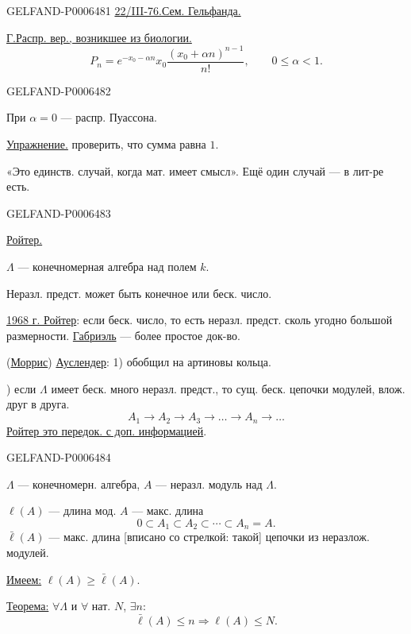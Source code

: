 \begin{GelfandAdjacentEvidence}{GELFAND-P000648}{1}
\underline{22/III-76.}\quad\underline{Сем. Гельфанда.}

\underline{Г.}\quad\underline{Распр. вер., возникшее из биологии.}
\[
P_n=e^{-x_0-\alpha n}x_0\frac{(x_0+\alpha n)^{n-1}}{n!},
\qquad 0\leqslant\alpha<1.
\]
\end{GelfandAdjacentEvidence}
\begin{GelfandAdjacentEvidence}{GELFAND-P000648}{2}


При \(\alpha=0\) --- распр. Пуассона.

\underline{Упражнение.} проверить, что сумма равна \(1\).

«Это единств. случай, когда мат. имеет смысл». Ещё один случай --- в лит-ре есть.
\end{GelfandAdjacentEvidence}
\begin{GelfandAdjacentEvidence}{GELFAND-P000648}{3}


\underline{Ройтер.}

\(\Lambda\) --- конечномерная алгебра над полем \(k\).

Неразл. предст. может быть конечное или беск. число.

\underline{1968 г. Ройтер}: если беск. число, то есть неразл. предст. сколь угодно большой размерности.
\underline{Габриэль} --- более простое док-во.

(\underline{Моррис}) \underline{Ауслендер}:
1) обобщил на артиновы кольца.

) если \(\Lambda\) имеет беск. много неразл. предст., то сущ. беск. цепочки модулей, влож. друг в друга.
\[
A_1\to A_2\to A_3\to\ldots\to A_n\to\ldots
\]
\underline{Ройтер это передок. с доп. информацией}.
\end{GelfandAdjacentEvidence}
\begin{GelfandAdjacentEvidence}{GELFAND-P000648}{4}


\(\Lambda\) --- конечномерн. алгебра, \(A\) --- неразл. модуль над \(\Lambda\).

\(\ell(A)\) --- длина мод. \(A\) --- макс. длина
\[
0\subset A_1\subset A_2\subset\cdots\subset A_n=A.
\]
\(\bar\ell(A)\) --- макс. длина [вписано со стрелкой: такой] цепочки из неразлож. модулей.

\underline{Имеем:} \(\ell(A)\geqslant\bar\ell(A)\).

\underline{Теорема:} \(\forall\Lambda\) и \(\forall\) нат. \(N\), \(\exists n\):
\[
\bar\ell(A)\leqslant n\Longrightarrow\ell(A)\leqslant N.
\]
\end{GelfandAdjacentEvidence}
